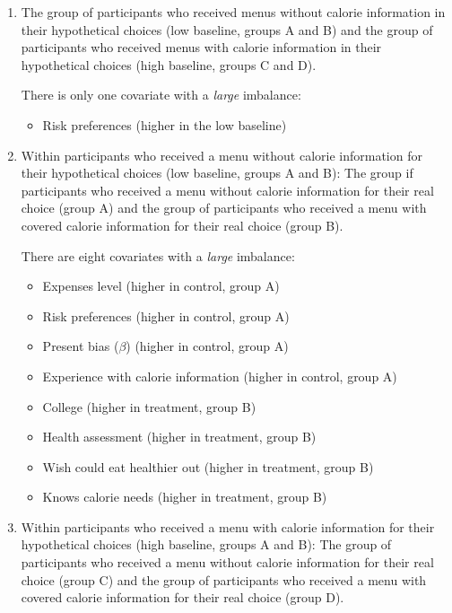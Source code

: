 \begin{enumerate}
  \item The group of participants who received menus without calorie information in their hypothetical choices (low baseline, groups A and B) and the group of participants who received menus with calorie information in their hypothetical choices (high baseline, groups C and D).

  There is only one covariate with a \emph{large} imbalance:
  \begin{itemize}
    \item Risk preferences (higher in the low baseline)
  \end{itemize}

  \item Within participants who received a menu without calorie information for their hypothetical choices (low baseline, groups A and B): The group if participants who received a menu without calorie information for their real choice (group A) and the group of participants who received a menu with covered calorie information for their real choice (group B).

  There are eight covariates with a \emph{large} imbalance:
  \begin{itemize}
    \item Expenses level (higher in control, group A)
    \item Risk preferences (higher in control, group A)
    \item Present bias ($\beta$) (higher in control, group A)
    \item Experience with calorie information (higher in control, group A)
    \item College (higher in treatment, group B)
    \item Health assessment (higher in treatment, group B)
    \item Wish could eat healthier out (higher in treatment, group B)
    \item Knows calorie needs (higher in treatment, group B)
  \end{itemize}

  \item Within participants who received a menu with calorie information for their hypothetical choices (high baseline, groups A and B): The group of participants who received a menu without calorie information for their real choice (group C) and the group of participants who received a menu with covered calorie information for their real choice (group D).


\end{enumerate}
